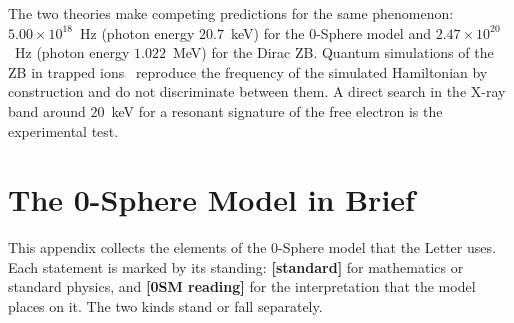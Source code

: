 \documentclass[%
 reprint, amsmath,amssymb, aps, prb, ]{revtex4-2}
\numberwithin{equation}{section}
\begin{document}
The two theories make competing predictions for the same phenomenon: $5.00\times10^{18}$~Hz (photon energy $20.7$~keV) for the 0-Sphere model and $2.47\times10^{20}$~Hz (photon energy $1.022$~MeV) for the Dirac ZB. Quantum simulations of the ZB in trapped ions~\cite{Gerritsma2010} reproduce the frequency of the simulated Hamiltonian by construction and do not discriminate between them. A direct search in the X-ray band around $20$~keV for a resonant signature of the free electron is the experimental test.

\appendix

\section{The 0-Sphere Model in Brief}
\label{app:model}

This appendix collects the elements of the 0-Sphere model that the Letter uses. Each statement is marked by its standing: \textbf{[standard]} for mathematics or standard physics, and \textbf{[0SM reading]} for the interpretation that the model places on it. The two kinds stand or fall separately.
\end{document}
